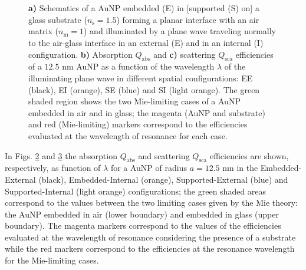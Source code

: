 \begin{figure}[b!]
    \small
    \centering
    \hspace*{-.75\textwidth}%
        \begin{subfigure}{.37\textwidth}\caption{ }\label{sfig:TotallyNormal:1}\end{subfigure}%
        \begin{subfigure}{.25\textwidth}\caption{ }\label{sfig:TotallyNormal:2}\end{subfigure} \\[6em]
    \hspace*{-.38\textwidth}%
        \begin{subfigure}{.25\textwidth}\caption{ }\label{sfig:TotallyNormal:3}\end{subfigure} \\[-9em]
    \def\svgwidth{.95\textwidth}
    \vspace*{0em}
    \caption[Absorption and Scattering Efficiencies of a 12.5 nm AuNP above and below a planar Interface Illuminated at Normal Incidence]{\textbf{a)} Schematics of a AuNP embedded (E) in [supported (S) on] a glass substrate ($n_\text{s} = 1.5$) forming a planar interface with an air matrix ($n_\text{m} = 1$) and illuminated by a plane wave traveling normally to the air-glass interface in an external (E) and in an internal (I) configuration. \textbf{b)} Absorption $Q_\text{abs}$ and \textbf{c)} scattering $Q_\text{sca}$ efficiencies of a $12.5$ nm AuNP as a function of the wavelength $\lambda$ of the illuminating plane wave in different spatial configurations: EE (black), EI (orange), SE (blue) and SI (light orange). The green shaded region shows the two Mie-limiting cases of a  AuNP embedded in air and in glass; the magenta (AuNP and substrate) and red (Mie-limiting) markers correspond to the efficiencies evaluated at the wavelength of resonance for each case.
    }
\label{fig:TotallyNormal}
\end{figure}

In Figs. \ref{sfig:TotallyNormal:2} and \ref{sfig:TotallyNormal:3}  the absorption $Q_\text{abs}$ and scattering $Q_\text{sca}$ efficiencies are shown, respectively, as function of $\lambda$ for a AuNP of radius $a = 12.5$ nm in the Embedded-External (black), Embedded-Internal (orange), Supported-External (blue) and Supported-Internal (light orange) configurations; the green shaded areas correspond to the values between the two limiting cases given by the Mie theory: the AuNP embedded in air (lower boundary) and embedded in glass (upper boundary). The magenta markers correspond to the values of the efficiencies evaluated at the wavelength of resonance considering the presence of a substrate while the red markers correspond to the efficiencies at the resonance wavelength for the Mie-limiting cases.

